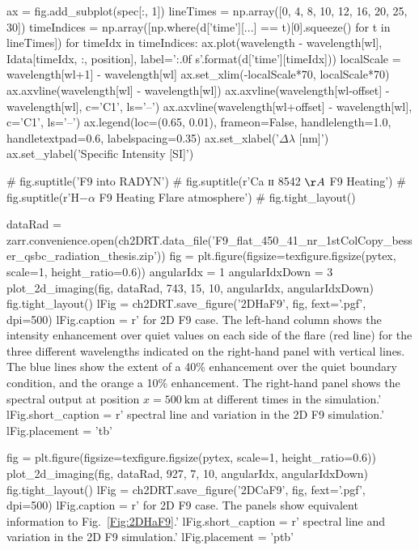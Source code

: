 \begin{pycode}[2DRT]
    ax = fig.add_subplot(spec[:, 1])
    lineTimes = np.array([0, 4, 8, 10, 12, 16, 20, 25, 30])
    timeIndices = np.array([np.where(d['time'][...] == t)[0].squeeze() for t in lineTimes])
    for timeIdx in timeIndices:
        ax.plot(wavelength - wavelength[wl], Idata[timeIdx, :, position], label='{:.0f} s'.format(d['time'][timeIdx]))
    localScale = wavelength[wl+1] - wavelength[wl]
    ax.set_xlim(-localScale*70, localScale*70)
    ax.axvline(wavelength[wl] - wavelength[wl])
    ax.axvline(wavelength[wl-offset] - wavelength[wl], c='C1', ls='--')
    ax.axvline(wavelength[wl+offset] - wavelength[wl], c='C1', ls='--')
    ax.legend(loc=(0.65, 0.01), frameon=False, handlelength=1.0, handletextpad=0.6, labelspacing=0.35)
    ax.set_xlabel('$\Delta\lambda$ [nm]')
    ax.set_ylabel('Specific Intensity [SI]')

#         fig.suptitle('F9 into RADYN')
#         fig.suptitle(r'Ca ɪɪ 8542 $\AA$ F9 Heating')
    # fig.suptitle(r'H$-\alpha$ F9 Heating Flare atmosphere')
    # fig.tight_layout()

dataRad = zarr.convenience.open(ch2DRT.data_file('F9_flat_450_41_nr_1stColCopy_besser_qsbc_radiation_thesis.zip'))
fig = plt.figure(figsize=texfigure.figsize(pytex, scale=1, height_ratio=0.6))
angularIdx = 1
angularIdxDown = 3
plot_2d_imaging(fig, dataRad, 743, 15, 10, angularIdx, angularIdxDown)
fig.tight_layout()
lFig = ch2DRT.save_figure('2DHaF9', fig, fext='.pgf', dpi=500)
lFig.caption = r'\Ha{} for 2D F9 case. The left-hand column shows the intensity enhancement over quiet values on each side of the flare (red line) for the three different wavelengths indicated on the right-hand panel with vertical lines. The blue lines show the extent of a 40\% enhancement over the quiet boundary condition, and the orange a 10\% enhancement. The right-hand panel shows the spectral output at position $x=\SI{500}{\kilo\metre}$ at different times in the simulation.'
lFig.short_caption = r'\Ha{} spectral line and variation in the 2D F9 simulation.'
lFig.placement = 'tb'
\end{pycode}

\begin{pycode}[2DRT]
fig = plt.figure(figsize=texfigure.figsize(pytex, scale=1, height_ratio=0.6))
plot_2d_imaging(fig, dataRad, 927, 7, 10, angularIdx, angularIdxDown)
fig.tight_layout()
lFig = ch2DRT.save_figure('2DCaF9', fig, fext='.pgf', dpi=500)
lFig.caption = r'\CaLine{} for 2D F9 case. The panels show equivalent information to Fig.~\ref{Fig:2DHaF9}.'
lFig.short_caption = r'\CaLine{} spectral line and variation in the 2D F9 simulation.'
lFig.placement = 'ptb'
\end{pycode}

